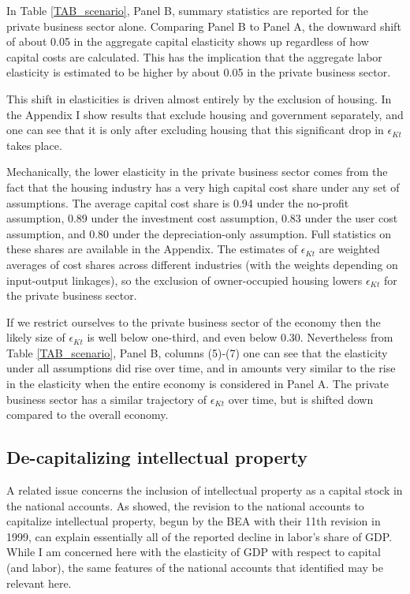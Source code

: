 \documentclass[11pt]{article}
\begin{document}
In Table \ref{TAB_scenario}, Panel B, summary statistics are reported for the private business sector alone. Comparing Panel B to Panel A, the downward shift of about 0.05 in the aggregate capital elasticity shows up regardless of how capital costs are calculated. This has the implication that the aggregate labor elasticity is estimated to be higher by about 0.05 in the private business sector. 

This shift in elasticities is driven almost entirely by the exclusion of housing. In the Appendix I show results that exclude housing and government separately, and one can see that it is only after excluding housing that this significant drop in $\epsilon_{Kt}$ takes place. 

Mechanically, the lower elasticity in the private business sector comes from the fact that the housing industry has a very high capital cost share under any set of assumptions. The average capital cost share is 0.94 under the no-profit assumption, 0.89 under the investment cost assumption, 0.83 under the user cost assumption, and 0.80 under the depreciation-only assumption. Full statistics on these shares are available in the Appendix. The estimates of $\epsilon_{Kt}$ are weighted averages of cost shares across different industries (with the weights depending on input-output linkages), so the exclusion of owner-occupied housing lowers $\epsilon_{Kt}$ for the private business sector. 

If we restrict ourselves to the private business sector of the economy then the likely size of $\epsilon_{Kt}$ is well below one-third, and even below 0.30. Nevertheless from Table \ref{TAB_scenario}, Panel B, columns (5)-(7) one can see that the elasticity under all assumptions did rise over time, and in amounts very similar to the rise in the elasticity when the entire economy is considered in Panel A. The private business sector has a similar trajectory of $\epsilon_{Kt}$ over time, but is shifted down compared to the overall economy.

\subsection{De-capitalizing intellectual property}
A related issue concerns the inclusion of intellectual property as a capital stock in the national accounts. As \cite{ksz2020} showed, the revision to the national accounts to capitalize intellectual property, begun by the BEA with their 11th revision in 1999, can explain essentially all of the reported decline in labor's share of GDP. While I am concerned here with the elasticity of GDP with respect to capital (and labor), the same features of the national accounts that \cite{ksz2020} identified may be relevant here. 
\end{document}
